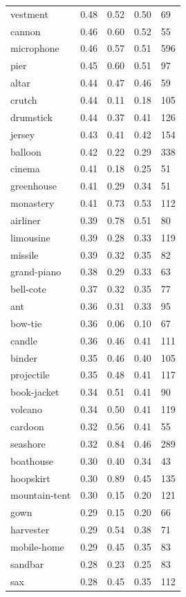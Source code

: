 \begin{center}
\begin{longtable}{lllll}
vestment & 0.48 & 0.52 & 0.50 & 69 \\
cannon & 0.46 & 0.60 & 0.52 & 55 \\
microphone & 0.46 & 0.57 & 0.51 & 596 \\
pier & 0.45 & 0.60 & 0.51 & 97 \\
altar & 0.44 & 0.47 & 0.46 & 59 \\
crutch & 0.44 & 0.11 & 0.18 & 105 \\
drumstick & 0.44 & 0.37 & 0.41 & 126 \\
jersey & 0.43 & 0.41 & 0.42 & 154 \\
balloon & 0.42 & 0.22 & 0.29 & 338 \\
cinema & 0.41 & 0.18 & 0.25 & 51 \\
greenhouse & 0.41 & 0.29 & 0.34 & 51 \\
monastery & 0.41 & 0.73 & 0.53 & 112 \\
airliner & 0.39 & 0.78 & 0.51 & 80 \\
limousine & 0.39 & 0.28 & 0.33 & 119 \\
missile & 0.39 & 0.32 & 0.35 & 82 \\
grand-piano & 0.38 & 0.29 & 0.33 & 63 \\
bell-cote & 0.37 & 0.32 & 0.35 & 77 \\
ant & 0.36 & 0.31 & 0.33 & 95 \\
bow-tie & 0.36 & 0.06 & 0.10 & 67 \\
candle & 0.36 & 0.46 & 0.41 & 111 \\
binder & 0.35 & 0.46 & 0.40 & 105 \\
projectile & 0.35 & 0.48 & 0.41 & 117 \\
book-jacket & 0.34 & 0.51 & 0.41 & 90 \\
volcano & 0.34 & 0.50 & 0.41 & 119 \\
cardoon & 0.32 & 0.56 & 0.41 & 55 \\
seashore & 0.32 & 0.84 & 0.46 & 289 \\
boathouse & 0.30 & 0.40 & 0.34 & 43 \\
hoopskirt & 0.30 & 0.89 & 0.45 & 135 \\
mountain-tent & 0.30 & 0.15 & 0.20 & 121 \\
gown & 0.29 & 0.15 & 0.20 & 66 \\
harvester & 0.29 & 0.54 & 0.38 & 71 \\
mobile-home & 0.29 & 0.45 & 0.35 & 83 \\
sandbar & 0.28 & 0.23 & 0.25 & 83 \\
sax & 0.28 & 0.45 & 0.35 & 112 \\

\end{longtable}
\end{center}
